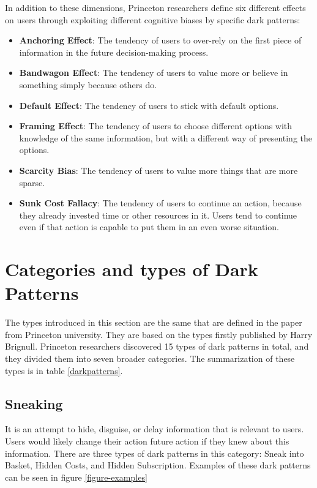 In addition to these dimensions, Princeton researchers define six different effects on users through exploiting different cognitive biases by specific dark patterns:

\begin{itemize}
    \item \textbf{Anchoring Effect}: The tendency of users to over-rely on the first piece of information in the future decision-making process.
    \item \textbf{Bandwagon Effect}: The tendency of users to value more or believe in something simply because others do.
    \item \textbf{Default Effect}: The tendency of users to stick with default options.
    \item \textbf{Framing Effect}: The tendency of users to choose different options with knowledge of the same information, but with a different way of presenting the options.
    \item \textbf{Scarcity Bias}: The tendency of users to value more things that are more sparse.
    \item \textbf{Sunk Cost Fallacy}: The tendency of users to continue an action, because they already invested time or other resources in it. Users tend to continue even if that action is capable to put them in an even worse situation.
\end{itemize}

\section{Categories and types of Dark Patterns}
The types introduced in this section are the same that are defined in the paper from Princeton university\cite{dark-patterns-at-scale}. They are based on the types firstly published by Harry Brignull\cite{dark-patterns-brignull}.
Princeton researchers discovered 15 types of dark patterns in total, and they divided them into seven broader categories. The summarization of these types is in table \ref{darkpatterns}.
    \subsection{Sneaking}
    It is an attempt to hide, disguise, or delay information that is relevant to users. Users would likely change their action future action if they knew about this information. There are three types of dark patterns in this category: Sneak into Basket, Hidden Costs, and Hidden Subscription. Examples of these dark patterns can be seen in figure \ref{figure-examples}
